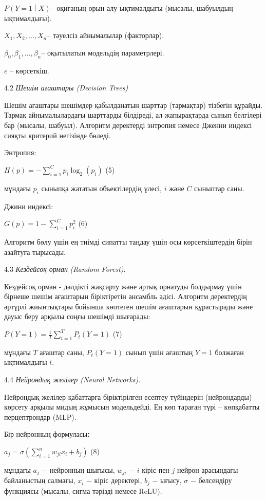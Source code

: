 \(P\left( Y = 1 \middle| X \right)\)-- оқиғаның орын алу ықтималдығы
(мысалы, шабуылдың ықтималдығы).

\(X_{1},X_{2},\ldots,X_{n}\)-- тәуелсіз айнымалылар (факторлар).

\(\beta_{0},\beta_{1},\ldots,\beta_{n}\)-- оқытылатын модельдің
параметрлері.

\(e\) -- көрсеткіш.

4.2 \emph{Шешім ағаштары (Decision Trees)}

Шешім ағаштары шешімдер қабылданатын шарттар (тармақтар) тізбегін
құрайды. Тармақ айнымалылардағы шарттарды білдіреді, ал жапырақтарда
сынып белгілері бар (мысалы, шабуыл). Алгоритм деректерді энтропия
немесе Дженни индексі сияқты критерий негізінде бөледі.

Энтропия:

\(H(p) = - \sum_{i = 1}^{C}{p_{i}\log_{2}(p_{i})}\) (5)

мұндағы \(p_{i}\) сыныпқа жататын объектілердің үлесі, \(i\) және \(C\)
сыныптар саны.

Джини индексі:

\(G(p) = 1 - \sum_{i = 1}^{C}p_{i}^{2}\) (6)

Алгоритм бөлу үшін ең тиімді сипатты таңдау үшін осы көрсеткіштердің
бірін азайтуға тырысады.

4.3 \emph{Кездейсоқ орман} \emph{(Random Forest)}.

Кездейсоқ орман - дәлдікті жақсарту және артық орнатуды болдырмау үшін
бірнеше шешім ағаштарын біріктіретін ансамбль әдісі. Алгоритм
деректердің әртүрлі жиынтықтары бойынша көптеген шешім ағаштарын
құрастырады және дауыс беру арқылы соңғы шешімді шығарады:

\(P(Y = 1) = \frac{1}{T}\sum_{t = 1}^{T}{P_{t}(Y = 1)}\) (7)

мұндағы \(T\) ағаштар саны, \(P_{t}(Y = 1)\) сынып үшін ағаштың
\(Y = 1\) болжаған ықтималдығы \(t\).

4.4 \emph{Нейрондық желілер (Neural Networks).}

Нейрондық желілер қабаттарға біріктірілген есептеу түйіндерін
(нейрондарды) көрсету арқылы мидың жұмысын модельдейді. Ең көп тараған
түрі -- көпқабатты перцептрондар (MLP).

Бір нейронның формуласы{\bfseries :}

\(a_{j} = \sigma\left( \sum_{i = 1}^{n}{w_{ji}x_{i} + b_{j}} \right)\)
(8)

мұндағы \(a_{j}\) − нейронның шығысы, \(w_{ji}\) − \(i\) кіріс пен \(j\)
нейрон арасындағы байланыстың салмағы, \(x_{i}\) − кіріс деректері,
\(b_{j}\) − ығысу, \(\sigma\) − белсендіру функциясы (мысалы, сигма
тәрізді немесе ReLU).

